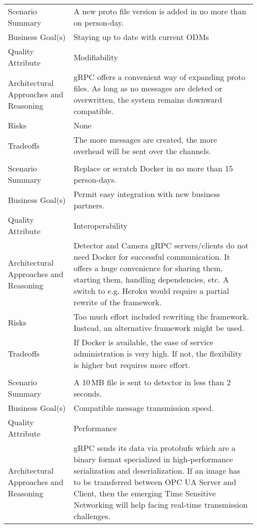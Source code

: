 {\begin{longtable}{| P{0.2\textwidth} | P{0.74\textwidth} |}
 \\ \hline
Scenario Summary & A new proto file version is added in no more than on person-day.\\ \hline
Business Goal(s) & Staying up to date with current ODMs\\ \hline
Quality Attribute & Modifiability\\ \hline
Architectural Approaches and Reasoning & gRPC offers a convenient way of expanding proto files. As long as no messages are deleted or overwritten, the system remains downward compatible.\\ \hline
Risks &  None\\ \hline
Tradeoffs &  The more messages are created, the more overhead will be sent over the channels.\\ \hline
{}
 \\ \hline
Scenario Summary & Replace or scratch Docker in no more than 15 person-days.\\ \hline
Business Goal(s) & Permit easy integration with new business partners. \\ \hline
Quality Attribute & Interoperability\\ \hline
Architectural Approaches and Reasoning & Detector and Camera gRPC servers/clients do not need Docker for successful communication. It offers a huge convenience for sharing them, starting them, handling dependencies, etc. A switch to e.g. Heroku would require a partial rewrite of the framework.\\ \hline
Risks &  Too much effort included rewriting the framework. Instead, an alternative framework might be used.\\ \hline
Tradeoffs & If Docker is available, the ease of service administration is very high. If not, the flexibility is higher but requires more effort.\\ \hline
{}
 \\ \hline
Scenario Summary & A 10\,MB file is sent to detector in less than 2 seconds. \\ \hline
Business Goal(s) & Compatible message transmission speed.\\ \hline
Quality Attribute & Performance\\ \hline
Architectural Approaches and Reasoning &  gRPC sends its data via protobufs which are a binary format specialized in high-performance serialization and deserialization. If an image has to be transferred between OPC UA Server and Client, then the emerging Time Sensitive Networking will help facing real-time transmission challenges.\\ \hline

\end{longtable}}
